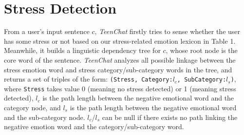 \section{Stress Detection}
From a user's input sentence $c$, \emph{TeenChat} firstly tries to sense whether the user has some stress or not
based on our stress-related emotion lexicon in Table 1.
Meanwhile, it builds a linguistic dependency tree for $c$, whose root node is the core
word of the sentence.
\emph{TeenChat} analyzes all possible linkage between the stress emotion word and stress category/sub-category words in the tree,
and returns a set of triples of the form:
\texttt{(Stress, Category:$l_c$, SubCategory:$l_s$)},
where \texttt{Stress} takes value 0 (meaning no stress detected) or 1 (meaning stress detected),
$l_c$ is the path length between the negative emotional word and the category node,
and $l_s$ is the path length between the negative emotional word and the sub-category node.
$l_c$/$l_s$ can be null if there exists no path linking the negative emotion word and
the category/sub-category word.
